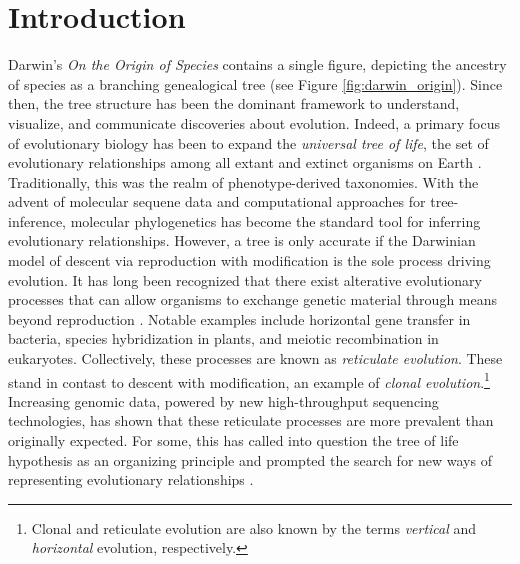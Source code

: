 \chapter{Introduction}
\label{ch:introduction}


Darwin's \emph{On the Origin of Species} contains a single figure, depicting the ancestry of species as a branching genealogical tree \cite{Darwin:1859uh} (see Figure \ref{fig:darwin_origin}).
Since then, the tree structure has been the dominant framework to understand, visualize, and communicate discoveries about evolution.
Indeed, a primary focus of evolutionary biology has been to expand the \emph{universal tree of life}, the set of evolutionary relationships among all extant and extinct organisms on Earth \cite{Bowler:2003uz}.
Traditionally, this was the realm of phenotype-derived taxonomies.
With the advent of molecular sequene data and computational approaches for tree-inference, molecular phylogenetics has become the standard tool for inferring evolutionary relationships.
However, a tree is only accurate if the Darwinian model of descent via reproduction with modification is the sole process driving evolution.
It has long been recognized that there exist alterative evolutionary processes that can allow organisms to exchange genetic material through means beyond reproduction \cite{Arnold:2007vq}.
Notable examples include horizontal gene transfer in bacteria, species hybridization in plants, and meiotic recombination in eukaryotes.
Collectively, these processes are known as \emph{reticulate evolution}.
These stand in contast to descent with modification, an example of \emph{clonal evolution}.\footnote{Clonal and reticulate evolution are also known by the terms \emph{vertical} and \emph{horizontal} evolution, respectively.}
Increasing genomic data, powered by new high-throughput sequencing technologies, has shown that these reticulate processes are more prevalent than originally expected.
For some, this has called into question the tree of life hypothesis as an organizing principle and prompted the search for new ways of representing evolutionary relationships \cite{Doolittle:1999,OMalley:2011tu}.

